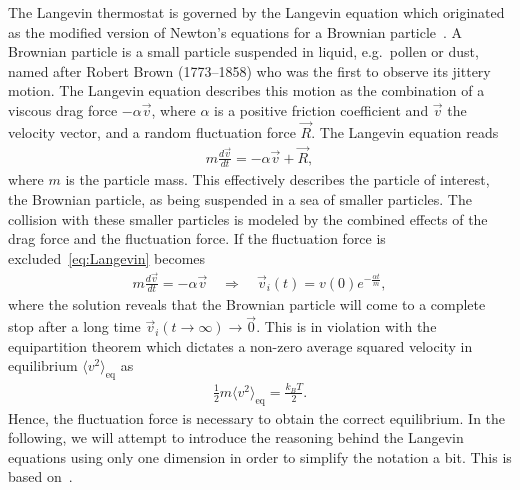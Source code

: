 The Langevin thermostat is governed by the Langevin equation which originated as the modified version of Newton's equations for a Brownian particle~\cite{stat_phys}. A Brownian particle is a small particle suspended in liquid,
e.g.\ pollen or dust, named after Robert Brown (1773–1858) who was the first to
observe its jittery motion. The Langevin equation describes this motion as the
combination of a viscous drag force $ -\alpha \vec{v}$, where $\alpha$ is a
positive friction coefficient and $\vec{v}$ the velocity vector, and a random
fluctuation force $\vec{R}$. The Langevin equation reads
\begin{align}
  m \frac{d \vec{v}}{dt} = -\alpha \vec{v} + \vec{R},
  \label{eq:Langevin}
\end{align}
where $m$ is the particle mass. This effectively describes the particle of
interest, the Brownian particle, as being suspended in a sea of smaller
particles. The collision with these smaller particles is modeled by the combined effects of the drag force and the fluctuation force. If the fluctuation force is excluded~\cref{eq:Langevin} becomes 
\begin{align*}
  m \frac{d \vec{v}}{dt} = -\alpha \vec{v} \quad \Rightarrow \quad 
  \vec{v}_i(t) = v(0)e^{- \frac{\alpha t}{m}},
\end{align*}
where the solution reveals that the Brownian particle will come to a complete stop
after a long time ${\vec{v}_i(t\to\infty) \to \vec{0}}$. This is in violation
with the equipartition theorem which dictates a non-zero average squared velocity in equilibrium $\langle v^2 \rangle_{\text{eq}}$ as
\begin{align}
  \frac{1}{2}m\langle v^2 \rangle_{\text{eq}} = \frac{k_B T}{2}.
  \label{eq:equipartion}
\end{align}
Hence, the fluctuation force is necessary to obtain the correct equilibrium. In the following, we will attempt to introduce the reasoning behind the Langevin equations using only one dimension in order to simplify the notation a bit. This is based on~\cite{stat_phys}.

